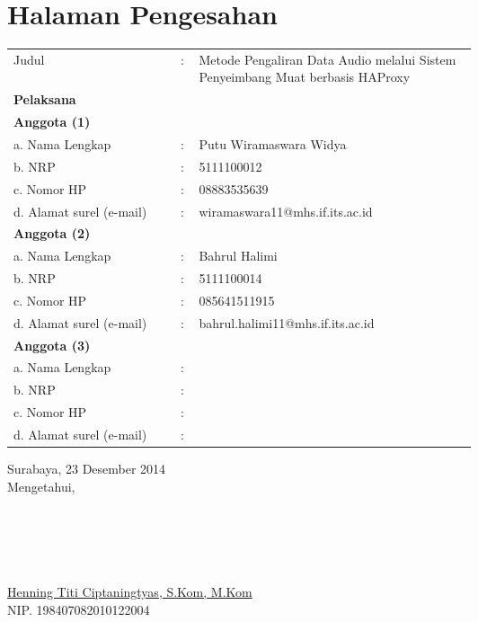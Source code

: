 \chapter{Halaman Pengesahan}
\begin{tabular}{llp{0.6\linewidth}}
Judul & : & Metode Pengaliran Data Audio melalui Sistem Penyeimbang Muat berbasis HAProxy 
\\
\textbf{Pelaksana} \\
\textbf{Anggota (1)} \\
a. Nama Lengkap & : & Putu Wiramaswara Widya\\
b. NRP & :&5111100012\\
c. Nomor HP & :& 08883535639\\
d. Alamat surel (e-mail) & :&wiramaswara11@mhs.if.its.ac.id\\
\textbf{Anggota (2)} \\
a. Nama Lengkap & :&Bahrul Halimi\\
b. NRP & :&5111100014\\
c. Nomor HP & :&085641511915\\
d. Alamat surel (e-mail) & :&bahrul.halimi11@mhs.if.its.ac.id\\
\textbf{Anggota (3)} \\
a. Nama Lengkap & :&\\
b. NRP & :&\\
c. Nomor HP & :&\\
d. Alamat surel (e-mail) & :&\\
\end{tabular}

\begin{center}
    Surabaya, 23 Desember 2014 \\
    Mengetahui,	\\
    \ \\
    \ \\
    \ \\
    \ \\
    \ \\
    \underline{Henning Titi Ciptaningtyas, S.Kom, M.Kom} \\
    NIP. 198407082010122004
\end{center}


